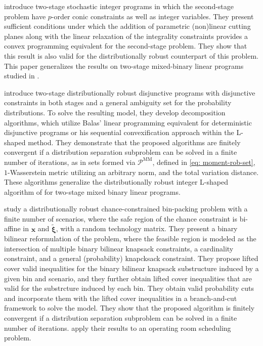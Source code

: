 \documentclass[final,onefignum,onetabnum]{class}
\newcommand{\bs}[1]{\boldsymbol{#1}} %
\newcommand{\Cs}[1]{\mathcal{#1}} %
\newcommand{\txi}{\tilde{\bs{\xi}}}
\begin{document}
\citet{bansal2018conic}   introduce  two-stage stochastic integer programs in which the second-stage problem have $p$-order conic constraints as well as integer variables. They present sufficient conditions under which the addition of parametric (non)linear
cutting planes along with the linear relaxation of the integrality constraints provides a convex programming equivalent for the second-stage problem. They show that this result is also valid for the distributionally robust counterpart of this problem. This paper generalizes the results on two-stage mixed-binary linear programs  studied in \citet{bansal2018}. 

\citet{bansal2018solving} introduce two-stage distributionally robust disjunctive programs with
disjunctive constraints in both stages and a general ambiguity set for the probability distributions. 
To solve the resulting model, they develop decomposition algorithms, which utilize Balas' linear programming equivalent for deterministic
disjunctive programs or his sequential convexification approach within the L-shaped method. They  demonstrate that the proposed algorithms are finitely convergent if a distribution separation subproblem can be solved in a finite number of iterations, as in sets formed via $\Cs{P}^{\text{MM}}$, defined in \eqref{eq: moment-rob-set}, $1$-Wasserstein metric utilizing an arbitrary norm, and the total variation distance.
These algorithms generalize the distributionally robust integer L-shaped algorithm of   \citet{bansal2018} for two-stage mixed binary linear programs. 



\citet{wang2019OR} study a distributionally robust chance-constrained bin-packing problem with a finite number of scenarios, where the safe region of the chance constraint is bi-affine in $\bs{x}$ and $\txi$, with a random technology matrix. They present a binary bilinear reformulation of the problem, where the feasible region is modeled as the intersection of multiple binary bilinear knapsack constraints, a cardinality constraint, and a general (probability) knapcksack constraint. They propose lifted cover valid inequalities for the binary bilinear knapsack substructure induced by a given bin and scenario, and they further obtain lifted  cover inequalities that are valid for the substrcture induced by each bin.
They obtain valid probability cuts and incorporate them with the lifted cover  inequalities in a branch-and-cut framework to solve the model. They show that the proposed algorithm is finitely convergent if a distribution separation subproblem can be solved in a finite number of iterations. \citet{wang2019OR} apply their results to an operating room scheduling problem. 
\end{document}
